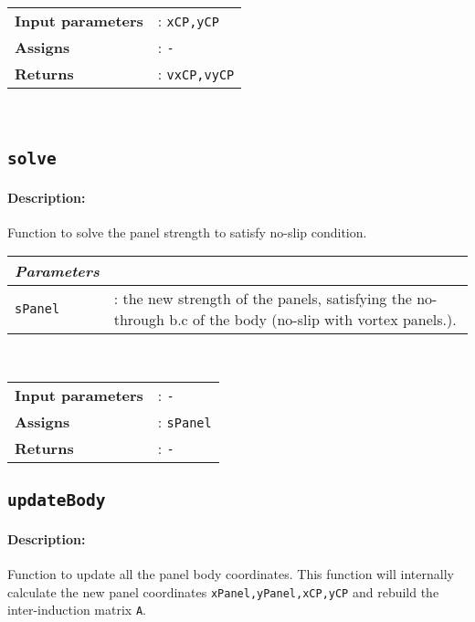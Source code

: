 		\begin{tabular}{lp{10cm}}
			\textbf{Input parameters} &: \texttt{xCP,yCP}\\ 
			\textbf{Assigns} &: \texttt{-}\\ 			
			\textbf{Returns} &: \texttt{vxCP,vyCP}\\ 					
		\end{tabular}\\

		
\subsection{\texttt{solve}}
	\paragraph{Description:} Function to solve the panel strength to satisfy no-slip condition.\\
	
		\begin{tabular}{lp{10cm}}
			\textit{Parameters} & \\ \hline
			\texttt{sPanel} &: the new strength of the panels, satisfying the no-through b.c of the body (no-slip with vortex panels.).\\
		\end{tabular} \vspace{5 mm}
		\\		
		\begin{tabular}{lp{10cm}}
			\textbf{Input parameters} &: \texttt{-}\\ 
			\textbf{Assigns} &: \texttt{sPanel}\\ 			
			\textbf{Returns} &: \texttt{-}\\ 					
		\end{tabular}		
			
		
\subsection{\texttt{updateBody}}
	\paragraph{Description:} Function to update all the panel body coordinates. This function will internally calculate the new panel coordinates \texttt{xPanel,yPanel,xCP,yCP} and rebuild the inter-induction matrix \texttt{A}.\\
	
